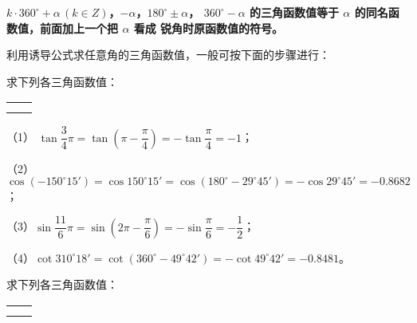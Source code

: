 \textbf{$k \cdot 360^\circ + \alpha \, (k \in Z)$，$-\alpha$，$180^\circ \pm \alpha$，
$360^\circ - \alpha$ 的三角函数值等于 $\alpha$ 的同名函数值，前面加上一个把 $\alpha$ 看成
锐角时原函数值的符号。}

利用诱导公式求任意角的三角函数值，一般可按下面的步骤进行：

\begin{figure}[htbp]
    \centering
    
\end{figure}

\liti 求下列各三角函数值：
\begin{xiaoxiaotis}

    \renewcommand\arraystretch{2}
    \begin{tabular}[t]{*{2}{@{}p{15em}}}
         &  \\
         & 
    \end{tabular}

\end{xiaoxiaotis}

\jie （1） $\tan \dfrac 3 4 \pi = \tan \left( \pi - \dfrac \pi 4 \right) = -\tan \dfrac \pi 4 = -1$；
\vspace{0.5em}

（2） $\cos (-150^\circ 15') = \cos 150^\circ 15' = \cos (180^\circ - 29^\circ 45') = -\cos 29^\circ 45' = -0.8682$；

\vspace{0.5em}
（3）$\sin \dfrac{11}{6} \pi = \sin \left( 2\pi - \dfrac \pi 6 \right) = -\sin \dfrac \pi 6 = -\dfrac 1 2$；
\vspace{0.5em}

（4）$\cot 310^\circ 18' = \cot (360^\circ - 49^\circ 42') = -\cot 49^\circ 42' = -0.8481$。

\liti 求下列各三角函数值：
\begin{xiaoxiaotis}

    \renewcommand\arraystretch{2}
    \begin{tabular}[t]{*{2}{@{}p{15em}}}
         &  \\
         & 
    \end{tabular}

\end{xiaoxiaotis}

